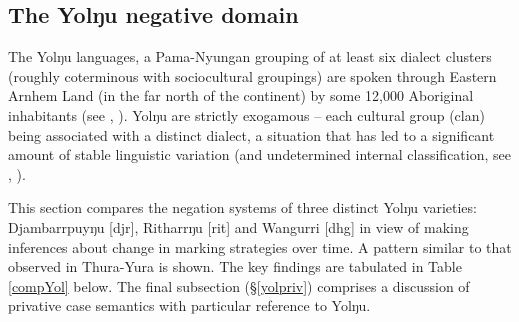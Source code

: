 {\subsection{The Yolŋu negative domain}\label{NEC-yolŋu}

The Yolŋu languages, a Pama-Nyungan grouping of at least six dialect clusters (roughly coterminous with sociocultural groupings) are spoken through Eastern Arnhem Land (in the far north of the continent) by some 12,000 Aboriginal inhabitants (see \citealt[18\textit{ff}]{Wilkinson1991}, \citealt{Bowern2009}). Yolŋu are strictly exogamous -- each cultural group (clan) being associated with a distinct dialect, a situation that has led to a significant amount of stable linguistic variation (and undetermined internal classification, see \citealt{Schebeck2001}, \citealt[836]{Bowern2012b}).

This section compares the negation systems of three distinct Yolŋu varieties: Djambarrpuyŋu [\gls{djr}], Ritharrŋu [\gls{rit}] and Wangurri [\gls{dhg}] in view of making inferences about change in marking strategies over time. A pattern similar to that observed in Thura-Yura is shown. The key findings are tabulated in Table \ref{compYol} below. The final subsection (§\ref{yolpriv}) comprises a discussion of privative case semantics with particular reference to Yolŋu.

}
